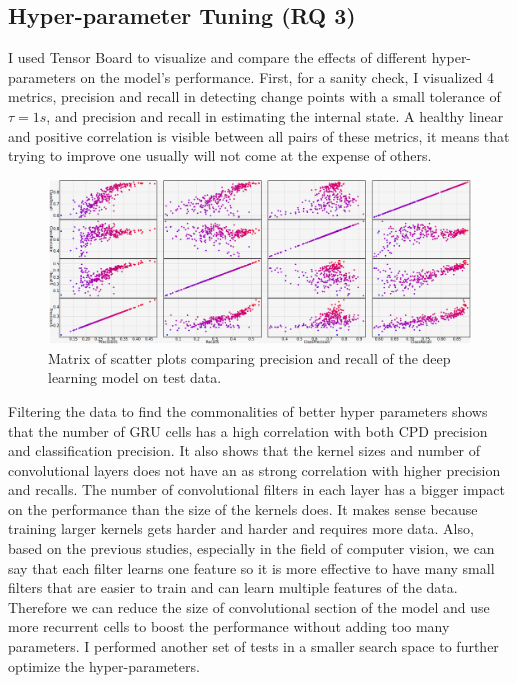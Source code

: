 \subsection{Hyper-parameter Tuning (RQ 3)}
I used Tensor Board to visualize and compare the effects of different hyper-parameters on the model's performance. First, for a sanity check, I visualized 4 metrics, precision and recall in detecting change points with a small tolerance of $\tau=1s$, and precision and recall in estimating the internal state. A healthy linear and positive correlation is visible between all pairs of these metrics, it means that trying to improve one usually will not come at the expense of others. 
\begin{figure}
    \centering
    \includegraphics[width=\columnwidth]{6_files/prec_recall_matrix_tuning.png}
    \caption{Matrix of scatter plots comparing precision and recall of the deep learning model on test data.}
    \label{fig:precision_recall_matrix}
\end{figure}

Filtering the data to find the commonalities of better hyper parameters shows that the number of GRU cells has a high correlation with both CPD precision and classification precision. 
It also shows that the kernel sizes and number of convolutional layers does not have an as strong correlation with higher precision and recalls. The number of convolutional filters in each layer has a bigger impact on the performance than the size of the kernels does. 
It makes sense because training larger kernels gets harder and harder and requires more data. Also, based on the previous studies, especially in the field of computer vision, we can say that each filter learns one feature so it is more effective to have many small filters that are easier to train and can learn multiple features of the data.
Therefore we can reduce the size of convolutional section of the model and use more recurrent cells to boost the performance without adding too many parameters. I performed another set of tests in a smaller search space to further optimize the hyper-parameters.

